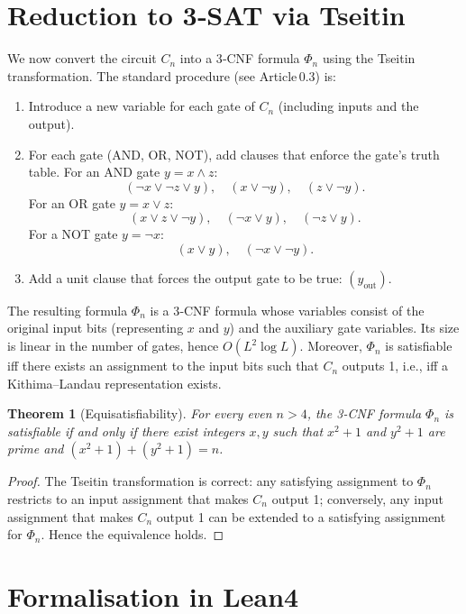 \documentclass[11pt,a4paper]{article}
\newtheorem{theorem}{Theorem}[section]
\begin{document}
\section{Reduction to 3‑SAT via Tseitin}

We now convert the circuit \(C_{n}\) into a 3‑CNF formula \(\Phi_{n}\) using the Tseitin transformation. The standard procedure (see Article 0.3) is:

\begin{enumerate}
\item Introduce a new variable for each gate of \(C_{n}\) (including inputs and the output).
\item For each gate (AND, OR, NOT), add clauses that enforce the gate’s truth table. For an AND gate \(y = x \land z\):
   \[
   (\neg x \lor \neg z \lor y),\quad (x \lor \neg y),\quad (z \lor \neg y).
   \]
   For an OR gate \(y = x \lor z\):
   \[
   (x \lor z \lor \neg y),\quad (\neg x \lor y),\quad (\neg z \lor y).
   \]
   For a NOT gate \(y = \neg x\):
   \[
   (x \lor y),\quad (\neg x \lor \neg y).
   \]
\item Add a unit clause that forces the output gate to be true: \((y_{\text{out}})\).
\end{enumerate}

The resulting formula \(\Phi_{n}\) is a 3‑CNF formula whose variables consist of the original input bits (representing \(x\) and \(y\)) and the auxiliary gate variables. Its size is linear in the number of gates, hence \(O(L^{2}\log L)\). Moreover, \(\Phi_{n}\) is satisfiable iff there exists an assignment to the input bits such that \(C_{n}\) outputs 1, i.e., iff a Kithima–Landau representation exists.

\begin{theorem}[Equisatisfiability]
\label{thm:equiv}
For every even \(n>4\), the 3‑CNF formula \(\Phi_{n}\) is satisfiable if and only if there exist integers \(x,y\) such that \(x^{2}+1\) and \(y^{2}+1\) are prime and \((x^{2}+1)+(y^{2}+1)=n\).
\end{theorem}
\begin{proof}
The Tseitin transformation is correct: any satisfying assignment to \(\Phi_{n}\) restricts to an input assignment that makes \(C_{n}\) output 1; conversely, any input assignment that makes \(C_{n}\) output 1 can be extended to a satisfying assignment for \(\Phi_{n}\). Hence the equivalence holds.
\end{proof}

\section{Formalisation in Lean4}
\end{document}
